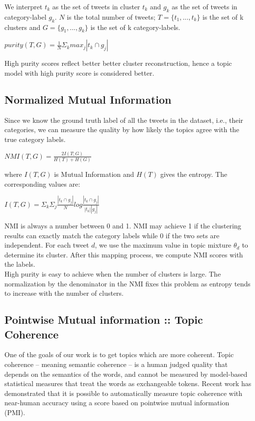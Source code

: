 \documentclass[10pt,a5paper,twoside]{article}
\begin{document}
We interpret $t_{k}$ as the set of tweets in cluster $t_{k}$ and $g_{k}$ as the set of tweets in category-label $g_{k}$. $N$ is the total number of tweets; $T = \lbrace t_{1}, ... , t_{k} \rbrace$ is the set of k clusters and $ G = \lbrace g_{1}, ... , g_{k}\rbrace $ is the set of k category-labels.

\begin{center}
$ purity (T,G) = \frac{1}{N} \Sigma_{k} max_{j} |t_{k} \cap g_{j}|$
\end{center}

High purity scores reflect better better cluster reconstruction, hence a topic model with high purity score is considered better.
\\

\subsection{Normalized Mutual Information}
Since we know the ground truth label of all the tweets in the dataset, i.e., their categories, we can measure the quality by how likely the topics agree with the true category labels. 
\begin{center}
$NMI(T,G) = \frac{2 I(T;G)}{H(T) + H(G)} $
\end{center}
where $I(T,G)$ is Mutual Information and $H(T)$ gives the entropy. The 
corresponding values are:

\begin{center}
$ I(T,G) = \Sigma_{k} \Sigma_{j} \frac{|t_{k} \cap g_{j}|}{N} log \frac{|t_{k} \cap g_{j}|}{|t_{k}| |g_{j}|} $
\end{center}

NMI is always a number between 0 and 1. NMI may achieve 1 if the clustering results can exactly match the category labels while 0 if the two sets are independent. For each tweet $d$, we use the maximum value in topic mixture $ \theta_{d} $ to determine its cluster. After this mapping process, we compute NMI scores with the labels.
\\
High purity is easy to achieve when the number of clusters is large. The normalization by the denominator in the NMI fixes this problem as entropy tends to increase with the number of clusters.

\subsection{Pointwise Mutual information :: Topic Coherence}

One of the goals of our work is to get topics which are more coherent. Topic coherence – meaning semantic coherence – is a human judged quality that depends on the semantics of the words, and cannot be measured by model-based statistical measures that treat the words as exchangeable tokens. Recent work has demonstrated that it is possible to automatically measure topic coherence with near-human accuracy using a score based on pointwise mutual information (PMI).
\end{document}

